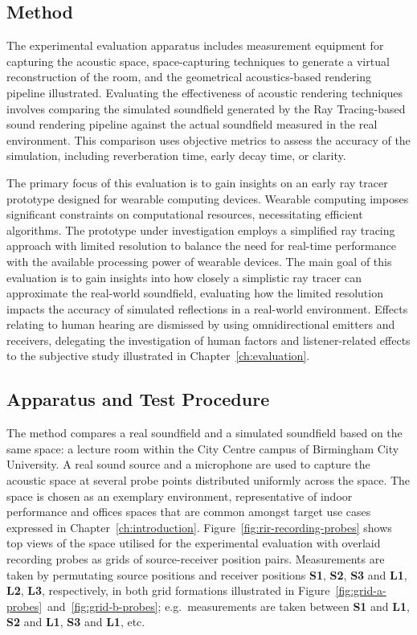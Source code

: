 \subsection{Method}
The experimental evaluation apparatus includes measurement equipment for capturing the acoustic space, space-capturing techniques to generate a virtual reconstruction of the room, and the geometrical acoustics-based rendering pipeline illustrated. Evaluating the effectiveness of acoustic rendering techniques involves comparing the simulated soundfield generated by the Ray Tracing-based sound rendering pipeline against the actual soundfield measured in the real environment. This comparison uses objective metrics to assess the accuracy of the simulation, including reverberation time, early decay time, or clarity.\par
The primary focus of this evaluation is to gain insights on an early ray tracer prototype designed for wearable computing devices. Wearable computing imposes significant constraints on computational resources, necessitating efficient algorithms. The prototype under investigation employs a simplified ray tracing approach with limited resolution to balance the need for real-time performance with the available processing power of wearable devices. The main goal of this evaluation is to gain insights into how closely a simplistic ray tracer can approximate the real-world soundfield, evaluating how the limited resolution impacts the accuracy of simulated reflections in a real-world environment. Effects relating to human hearing are dismissed by using omnidirectional emitters and receivers, delegating the investigation of human factors and listener-related effects to the subjective study illustrated in Chapter~\ref{ch:evaluation}.

\subsection{Apparatus and Test Procedure}\label{sec:acoustic_eval_procedure}
The method compares a real soundfield and a simulated soundfield based on the same space: a lecture room within the City Centre campus of Birmingham City University. A real sound source and a microphone are used to capture the acoustic space at several probe points distributed uniformly across the space. The space is chosen as an exemplary environment, representative of indoor performance and offices spaces that are common amongst target use cases expressed in Chapter~\ref{ch:introduction}. Figure~\ref{fig:rir-recording-probes} shows top views of the space utilised for the experimental evaluation with overlaid recording probes as grids of source-receiver position pairs. Measurements are taken by permutating source positions and receiver positions \textbf{S1}, \textbf{S2}, \textbf{S3} and \textbf{L1}, \textbf{L2}, \textbf{L3}, respectively, in both grid formations illustrated in Figure~\ref{fig:grid-a-probes}~and~\ref{fig:grid-b-probes}; e.g.\ measurements are taken between \textbf{S1} and \textbf{L1}, \textbf{S2} and \textbf{L1}, \textbf{S3} and \textbf{L1}, etc. 

